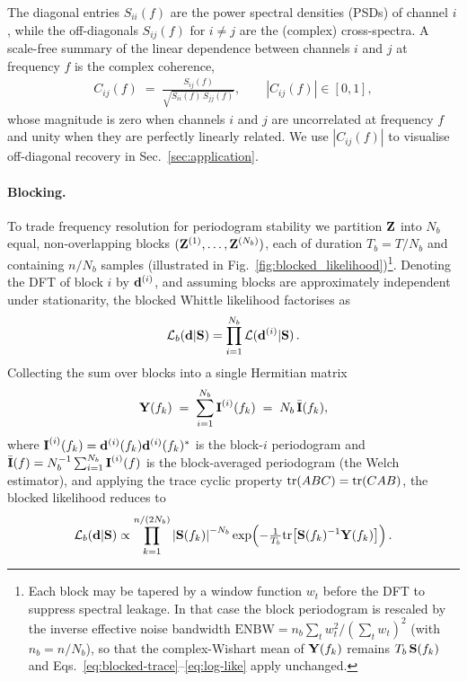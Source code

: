 \documentclass[%
	reprint,
	nofootinbib,
	amsmath,
	amssymb,
	aps,
]{revtex4-2}
\begin{document}
	The diagonal entries $S_{ii}(f)$ are the power spectral densities (PSDs) of channel $i$,
	while the off-diagonals $S_{ij}(f)$ for $i\neq j$ are the (complex)
	cross-spectra. A scale-free summary of the linear dependence between
	channels $i$ and $j$ at frequency $f$ is the complex coherence,
	\begin{align}
		\label{eq:coherence}
		C_{ij}(f) \;=\; \frac{S_{ij}(f)}{\sqrt{S_{ii}(f)\,S_{jj}(f)}},
		\qquad |C_{ij}(f)|\in[0,1],
	\end{align}
	whose magnitude is zero when channels $i$ and $j$ are uncorrelated at
	frequency $f$ and unity when they are perfectly linearly related.
	We use $|C_{ij}(f)|$ to visualise off-diagonal recovery in
	Sec.~\ref{sec:application}.

	\paragraph*{Blocking.}
	To trade frequency resolution for periodogram stability we partition
	$\Z$ into $N_{b}$ equal, non-overlapping blocks
	$(\Z^{(1)},\ldots,\Z^{(N_{b})})$, each of duration $T_{b}=T/N_{b}$
	and containing $n/N_{b}$ samples (illustrated in
	Fig.~\ref{fig:blocked_likelihood})\footnote{Each block may be
	tapered by a window function $w_{t}$ before the DFT to suppress
	spectral leakage. In that case the block periodogram is rescaled by
	the inverse effective noise bandwidth
	$\mathrm{ENBW}=n_{b}\sum_{t}w_{t}^{2}/(\sum_{t}w_{t})^{2}$ (with
	$n_{b}=n/N_{b}$), so that the complex-Wishart mean of $\Y(f_{k})$
	remains $T_{b}\,\S(f_{k})$ and
	Eqs.~\eqref{eq:blocked-trace}--\eqref{eq:log-like} apply unchanged.}.
	Denoting the DFT of block $i$ by
	$\d^{(i)}$, and assuming blocks are approximately independent under
	stationarity, the blocked Whittle likelihood factorises as
	\begin{equation}
		\label{eq:block_lnl}
		\mathcal{L}_{b}(\d|\S) = \prod_{i=1}^{N_b}\mathcal{L}(\d^{(i)}|\S)\, .
	\end{equation}
	Collecting the sum over blocks into a single Hermitian matrix
	\begin{equation}
		\label{eq:Y_def}
		\Y(f_{k}) \;=\; \sum_{i=1}^{N_{b}}\I^{(i)}(f_{k})
		\;=\; N_{b}\,\bar{\I}(f_{k}),
	\end{equation}
	where $\I^{(i)}(f_{k})=\d^{(i)}(f_{k})\d^{(i)}(f_{k})^{*}$ is the
	block-$i$ periodogram and
	$\bar{\I}(f)=N_{b}^{-1}\sum_{i=1}^{N_{b}}\I^{(i)}(f)$ is the
	block-averaged periodogram (the Welch estimator), and applying the
	trace cyclic property $\tr(ABC)=\tr(CAB)$, the blocked likelihood
	reduces to
	\begin{equation}
		\label{eq:blocked-trace}
		\mathcal{L}_{b}(\d|\S)
		\propto \prod_{k=1}^{n/(2N_{b})}
		\left|\S(f_{k})\right|^{-N_{b}}
		\exp\!\left(-\tfrac{1}{T_{b}}\tr\!\left[\S(f_{k})^{-1}\Y(f_{k})\right]\right).
	\end{equation}
\end{document}
